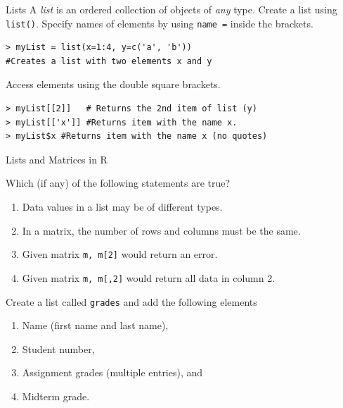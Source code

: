 \documentclass[xcolor=svgnames, 10pt, handout]{beamer}
\begin{document}
\begin{frame}[fragile]{Lists}
A \emph{list} is an ordered collection of objects of \emph{any} type.
\vfill
Create a list using \texttt{list()}.  Specify names of elements by using \texttt{name =} inside the brackets.
\begin{Verbatim}[commandchars=\\\{\}, xleftmargin=2em]
> myList = list(x=1:4, y=c('a', 'b'))
#Creates a list with two elements x and y
\end{Verbatim}
\vfill
Access elements using the double square brackets.
\begin{Verbatim}[commandchars=\\\{\}, xleftmargin=2em]
> myList[[2]]   # Returns the 2nd item of list (y)
> myList[['x']] #Returns item with the name x.
> myList$x #Returns item with the name x (no quotes)
\end{Verbatim}
\end{frame}


\begin{frame}[fragile]{Lists and Matrices in R}
\begin{question}
Which (if any) of the following statements are true?
\begin{enumerate}
\item Data values in a list may be of different types. \onslide<+-> \pxmark
\item In a matrix, the number of rows and columns must be the same. \pxmark
\item Given matrix \texttt{m, m[2]} would return an error. \pxmark
\item Given matrix \texttt{m, m[,2]} would return all data in column 2. \pxmark
\end{enumerate}
\end{question}
\end{frame}


\begin{frame}[fragile]
\begin{question}
Create a list called \texttt{grades} and add the following elements
\begin{enumerate}
\item Name (first name and last name),
\item Student number,
\item Assignment grades (multiple entries), and
\item Midterm grade.
\end{enumerate}
\end{question}
\end{frame}
\end{document}
